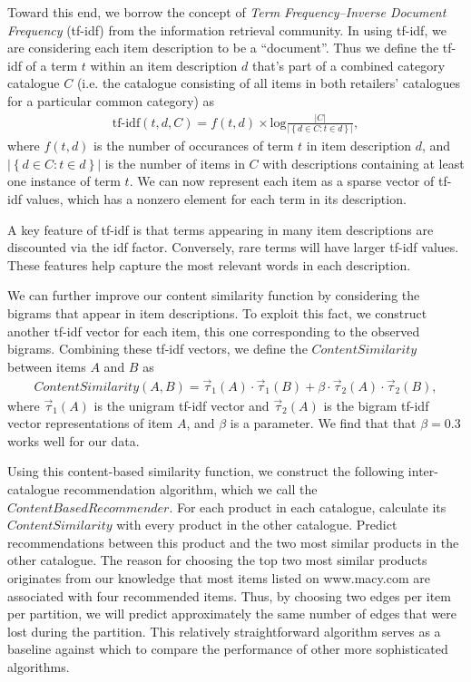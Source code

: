 \documentclass[11pt]{article}
\begin{document}
Toward this end, we borrow the concept of {\em Term Frequency--Inverse Document
Frequency} (tf-idf) from the information retrieval community. In using tf-idf, we
are considering each item description to be a ``document''.  Thus we define the
tf-idf of a term $t$ within an item description $d$ that's part of a combined
category catalogue $C$ (i.e. the catalogue consisting of all items in both
retailers' catalogues for a particular common category) as
\begin{align}
\textrm{tf-idf}(t,d,C) = f(t,d) \times
\mathrm{log}\frac{\left|C\right|}{\left|\left\{d \in C : t \in
d\right\}\right|},
\end{align}
where $f(t,d)$ is the number of occurances of term $t$ in item description $d$,
and $\left|\left\{d \in C : t \in d\right\}\right|$ is the number of items in
$C$ with descriptions containing at least one instance of term $t$.  We can now
represent each item as a sparse vector of tf-idf values, which has a nonzero
element for each term in its description.

A key feature of tf-idf is that terms appearing in many item descriptions are
discounted via the idf factor. Conversely, rare terms will have larger tf-idf
values. These features help capture the most relevant words in each description.

We can further improve our content similarity function by considering the
bigrams that appear in item descriptions. To exploit this fact, we construct
another tf-idf vector for each item, this one corresponding to the observed
bigrams. Combining these tf-idf vectors, we define the $ContentSimilarity$
between items $A$ and $B$ as
\begin{align}
ContentSimilarity(A,B) = \vec{\tau}_1(A) \cdot \vec{\tau}_1(B) + \beta \cdot
\vec{\tau}_2(A) \cdot \vec{\tau}_2(B),
\end{align}
where $\vec{\tau}_1(A)$ is the unigram tf-idf vector and $\vec{\tau}_2(A)$ is
the bigram tf-idf vector representations of item $A$, and $\beta$ is a
parameter. We find that that $\beta=0.3$ works well for our data.

Using this content-based similarity function, we construct the following
inter-catalogue recommendation algorithm, which we call the $ContentBased
Recommender$. For each product in each catalogue, calculate its
$ContentSimilarity$ with every product in the other catalogue. Predict
recommendations between this product and the two most similar products in
the other catalogue. The reason for choosing the top two most similar products
originates from our knowledge that most items listed on www.macy.com are
associated with four recommended items. Thus, by choosing two edges per item per
partition, we will predict approximately the same number of edges that were lost
during the partition. This relatively straightforward algorithm serves as a
baseline against which to compare the performance of other more sophisticated
algorithms.
\end{document}
